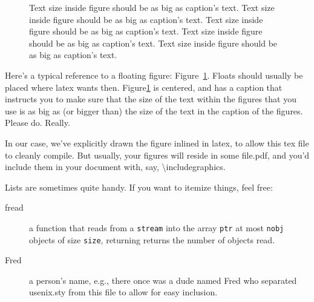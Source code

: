 \begin{figure}
  \begin{center}
  \end{center}
  \caption{\label{fig:vectors} Text size inside figure should be as big as
    caption's text. Text size inside figure should be as big as
    caption's text. Text size inside figure should be as big as
    caption's text. Text size inside figure should be as big as
    caption's text. Text size inside figure should be as big as
    caption's text. }
\end{figure}






Here's a typical reference to a floating figure:
Figure~\ref{fig:vectors}. Floats should usually be placed where latex
wants then. Figure\ref{fig:vectors} is centered, and has a caption
that instructs you to make sure that the size of the text within the
figures that you use is as big as (or bigger than) the size of the
text in the caption of the figures. Please do. Really.

In our case, we've explicitly drawn the figure inlined in latex, to
allow this tex file to cleanly compile. But usually, your figures will
reside in some file.pdf, and you'd include them in your document
with, say, \textbackslash{}includegraphics.

Lists are sometimes quite handy. If you want to itemize things, feel
free:

\begin{description}

  \item[fread] a function that reads from a \texttt{stream} into the
        array \texttt{ptr} at most \texttt{nobj} objects of size
        \texttt{size}, returning returns the number of objects read.

  \item[Fred] a person's name, e.g., there once was a dude named Fred
        who separated usenix.sty from this file to allow for easy
        inclusion.
\end{description}

